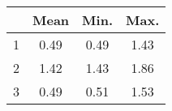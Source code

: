 \begin{table}[ht]
\centering
\begin{tabular}{lccc}
  \hline
 & Mean & Min. & Max. \\ 
  \hline
1  & 0.49 & 0.49 &  1.43 \\ 
  2   & 1.42 & 1.43 & 1.86 \\ 
  3  & 0.49 & 0.51 & 1.53 \\ 
   \hline
\end{tabular}
\end{table}
